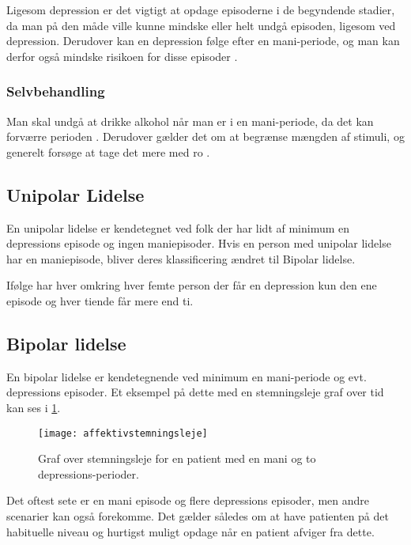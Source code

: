 Ligesom depression er det vigtigt at opdage episoderne i de begyndende stadier, da man på den måde ville kunne mindske eller helt undgå episoden, ligesom ved depression.
Derudover kan en depression følge efter en mani-periode, og man kan derfor også mindske risikoen for disse episoder \citep{misc:bipolarsundhed}.

\subsubsection{Selvbehandling}
Man skal undgå at drikke alkohol når man er i en mani-periode, da det kan forværre perioden \citep{misc:netpsykmani}.
Derudover gælder det om at begrænse mængden af stimuli, og generelt forsøge at tage det mere med ro \citep{misc:janne-rasmussen}.

\subsection{Unipolar Lidelse}
En unipolar lidelse er kendetegnet ved folk der har lidt af minimum en depressions episode og ingen maniepisoder.
Hvis en person med unipolar lidelse har en maniepisode, bliver deres klassificering ændret til Bipolar lidelse.

Ifølge \citet{misc:netpsykdepression} har hver omkring hver femte person der får en depression kun den ene episode og hver tiende får mere end ti.

\subsection{Bipolar lidelse}
En bipolar lidelse er kendetegnende ved minimum en mani-periode og evt. depressions episoder.
Et eksempel på dette med en stemningsleje graf over tid kan ses i \cref{fig:stemningslejegrafeksempel}.

\begin{figure}
	\centering
	\texttt{[image: affektivstemningsleje]}
	\caption{Graf over stemningsleje for en patient med en mani og to depressions-perioder.}\label{fig:stemningslejegrafeksempel}
\end{figure}

Det oftest sete er en mani episode og flere depressions episoder, men andre scenarier kan også forekomme.
Det gælder således om at have patienten på det habituelle niveau og hurtigst muligt opdage når en patient afviger fra dette.